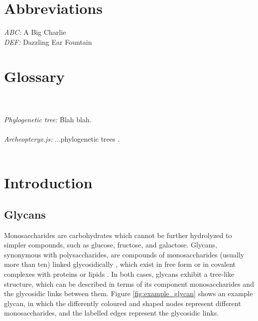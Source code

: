 \documentclass[12pt,a4paper]{article}
\begin{document}
\section*{Abbreviations}
\doublespacing
\textit{ABC:} A Big Charlie\\
\textit{DEF:} Dazzling Ear Fountain\\

\newpage
\section*{Glossary}
\label{sec:glossary}
\doublespacing
{}\\\\
\textit{Phylogenetic tree:} Blah blah.\\\\
\textit{Archeopteryx.js:} ...phylogenetic trees .\\\\













\newpage
\section{Introduction}
\label{sec:intro}







\subsection{Glycans}
\label{sec:glycans_description}
Monosaccharides are carbohydrates which cannot be further hydrolyzed to simpler compounds, such as glucose, fructose, and galactose. Glycans, synonymous with polysaccharides, are compounds of monosaccharides (usually more than ten) linked glycosidically \citep{mcnaught1997compendium}, which exist in free form or in covalent complexes with proteins or lipids \citep{doi:10.1093/bioinformatics/btm090}. In both cases, glycans exhibit a tree-like structure, which can be described in terms of its component monosaccharides and the glycosidic links between them. Figure \ref{fig:example_glycan} shows an example glycan, in which the differently coloured and shaped nodes represent different monosaccharides, and the labelled edges represent the glycosidic links.\\
\end{document}
